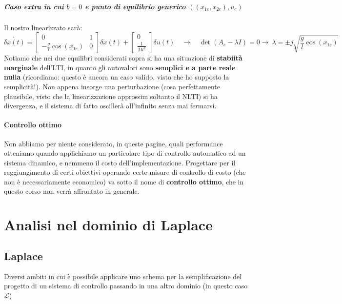 \documentclass[a4paper]{report}
\begin{document}
\begin{esem}
\subsubsection{Caso extra in cui $b = 0$ e punto di equilibrio generico $((x_{1e},x_{2e}),u_e)$}
Il nostro linearizzato sarà:
\begin{equation*}
	\dot{\delta x(t)} = \begin{bmatrix}
 0 & 1 \\ -\frac{g}{l}\cos(x_{1e}) & 0	
 \end{bmatrix} \delta x(t) + \begin{bmatrix}
 	0 \\ \frac{1}{Ml^2}
 \end{bmatrix} \delta u(t) \quad \rightarrow \quad 
	\det(A_e - \lambda I) = 0 \rightarrow \ \lambda = \pm j \sqrt{\frac{g}{l}  \cos(x_{1e})} 
\end{equation*}
Notiamo che nei due equilibri considerati sopra si ha una situazione di \textbf{stabiità marginale} dell'LTI, in quanto gli autovalori sono \textbf{semplici e a parte reale nulla} (ricordiamo: questo è ancora un caso valido, visto che ho supposto la semplicità!). Non appena insorge una perturbazione (cosa perfettamente plausibile, visto che la linearizzazione approssim soltanto il NLTI) si ha divergenza, e il sistema di fatto oscillerà all'infinito senza mai fermarsi. 
\end{esem}

\subsection{Controllo ottimo}
Non abbiamo per niente considerato, in queste pagine, quali performance otteniamo quando applichiamo un particolare tipo di controllo automatico ad un sistema dinamico, e nemmeno il costo dell'implementazione. Progettare per il raggiungimento di certi obiettivi operando certe misure di controllo di costo (che non è necessariamente economico) va sotto il nome di \textbf{controllo ottimo}, che in questo corso non verrà affrontato in generale.

\part{Analisi nel dominio di Laplace}

\chapter{Laplace}
\Huge
Diversi ambiti in cui è possibile applicare uno schema per la semplificazione del progetto di un sistema di controllo passando in una altro dominio (in questo caso $\mathcal{L}$)
\end{document}
